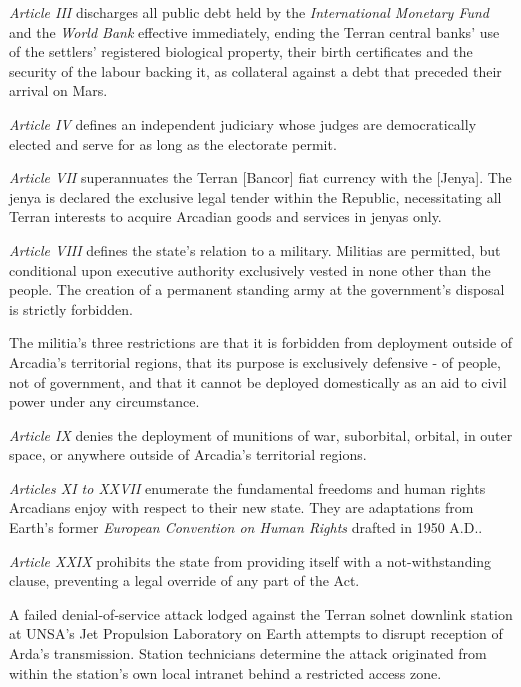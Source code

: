 \item {\it Article III} discharges all public debt held by the {\it International Monetary Fund} and the {\it World Bank} effective immediately, ending the Terran central banks' use of the settlers' registered biological property, their birth certificates and the security of the labour backing it, as collateral against a debt that preceded their arrival on Mars.

\item {\it Article IV} defines an independent judiciary whose judges are democratically elected and serve for as long as the electorate permit.

\item {\it Article VII} superannuates the Terran [Bancor] fiat currency with the [Jenya]. The jenya is declared the exclusive legal tender within the Republic, necessitating all Terran interests to acquire Arcadian goods and services in jenyas only.

\item {\it Article VIII} defines the state's relation to a military. Militias are permitted, but conditional upon executive authority exclusively vested in none other than the people. The creation of a permanent standing army at the government's disposal is strictly forbidden.

The militia's three restrictions are that it is forbidden from deployment outside of Arcadia's territorial regions, that its purpose is exclusively defensive - of people, not of government, and that it cannot be deployed domestically as an aid to civil power under any circumstance.

\item {\it Article IX} denies the deployment of munitions of war, suborbital, orbital, in outer space, or anywhere outside of Arcadia's territorial regions.

\item {\it Articles XI to XXVII} enumerate the fundamental freedoms and human rights Arcadians enjoy with respect to their new state. They are adaptations from Earth's former {\it European Convention on Human Rights} drafted in 1950 A.D..

\item {\it Article XXIX} prohibits the state from providing itself with a not-withstanding clause, preventing a legal override of any part of the Act.
\stopitemize
\stopTimelineDocument

A failed denial-of-service attack lodged against the Terran solnet downlink station at UNSA's Jet Propulsion Laboratory on Earth attempts to disrupt reception of Arda's transmission. Station technicians determine the attack originated from within the station's own local intranet behind a restricted access zone.

